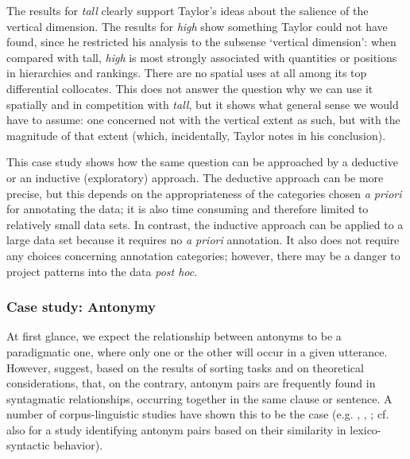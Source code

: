 The results for \textit{tall} clearly support Taylor's ideas about the salience of the vertical dimension. The results for \textit{high} show something Taylor could not have found, since he restricted his analysis to the subsense `vertical dimension': when compared with tall, \textit{high} is most strongly associated  with quantities or positions in hierarchies and rankings. There are no spatial uses at all among its top differential collocates.  This does not answer the question why we can use it spatially and in competition with \textit{tall}, but it shows what general sense we would have to assume: one concerned not with the vertical extent as such, but with the magnitude of that extent (which, incidentally, Taylor notes in his conclusion).

This case study shows how the same question can be approached by a deductive  or an inductive  (exploratory)  approach. The deductive approach can be more precise, but this depends on the appropriateness of the categories  chosen \textit{a priori} for annotating  the data; it is also time consuming and therefore limited to relatively small data sets. In contrast, the inductive  approach can be applied to a large  data set because it requires no \textit{a priori} annotation.  It also does not require any choices concerning annotation categories;  however, there may be a danger to project patterns into the data \textit{post hoc}.

\subsubsection{Case study: Antonymy}
\label{sec:antonymy}

At first glance, we expect the relationship between antonyms  to be a paradigmatic  one, where only one or the other will occur in a given utterance. However, \citet{charles_contexts_1989} suggest, based on the results of sorting tasks and on theoretical considerations, that, on the contrary, antonym pairs are frequently found in syntagmatic  relationships, occurring together in the same clause or sentence. A number of corpus\hyp{}linguistic studies have shown this to be the case (e.g. \citealt{justeson_co-occurrences_1991}, \citealt{justeson_redefining_1992}, \citealt{fellbaum_co-occurrence_1995}; cf. also \citealt{gries_behavioral_2010} for a study identifying antonym  pairs based on their similarity in lexico\hyp{}syntactic  behavior).

